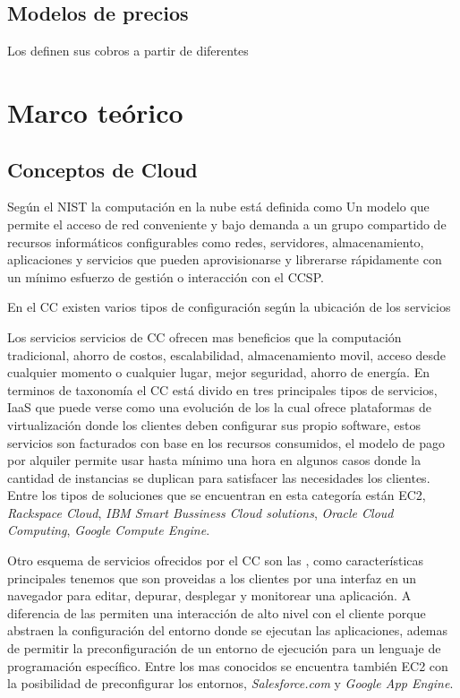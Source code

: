 \subsection{Modelos de precios}
Los  definen sus cobros a partir de diferentes


\section{Marco teórico}
\subsection{Conceptos de Cloud}
Según el \acrshort{NIST} la computación en la nube está definida como  Un modelo que permite el acceso de red conveniente y bajo demanda a un grupo compartido de recursos informáticos configurables como redes, servidores, almacenamiento, aplicaciones y servicios que pueden aprovisionarse y librerarse rápidamente con un mínimo esfuerzo de gestión o interacción con el \acrshort{CCSP}\cite{liu2011nist}.
\bigskip

En el \acrshort{CC} existen varios tipos de configuración según la ubicación de los servicios

Los servicios servicios de \acrshort{CC} ofrecen mas beneficios que la computación tradicional, ahorro de costos, escalabilidad, almacenamiento movil, acceso desde cualquier momento o cualquier lugar, mejor seguridad, ahorro de energía\cite{sether2016cloud}. En terminos de taxonomía el \acrshort{CC} está divido en tres principales tipos de servicios, \acrfull{IaaS} que puede verse como una evolución de los  la cual ofrece plataformas de virtualización donde los clientes deben configurar sus propio software, estos servicios son facturados con base en los recursos consumidos, el modelo de pago por alquiler permite usar hasta mínimo una hora en algunos casos donde la cantidad de instancias se duplican para satisfacer las necesidades los clientes. Entre los tipos de soluciones que se encuentran en esta categoría están \acrfull{EC2}, \emph{Rackspace Cloud}, \emph{IBM Smart Bussiness Cloud solutions}, \emph{Oracle Cloud Computing}, \emph{Google Compute Engine}. \cite[p.2]{sether2016cloud}\bigskip

Otro esquema de servicios ofrecidos por el \acrshort{CC} son las  , como características principales tenemos que son proveidas a los clientes por una interfaz en un navegador para editar, depurar, desplegar y monitorear una aplicación.\cite[p.1]{lawton2008developing} A diferencia de las  permiten una interacción de alto nivel con el cliente porque abstraen la configuración del entorno donde se ejecutan las aplicaciones, ademas de permitir la preconfiguración de un entorno de ejecución para un lenguaje de programación específico. Entre los  mas conocidos se encuentra también \acrshort{EC2} con la posibilidad de preconfigurar los entornos,  \emph{Salesforce.com} y \emph{Google App Engine}. \bigskip

